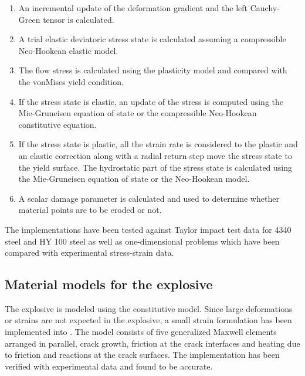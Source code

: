 \begin{itemize}
\begin{enumerate}
        \item An incremental update of the deformation gradient and
              the left Cauchy-Green tensor is calculated.
        \item A trial elastic deviatoric stress state is calculated
              assuming a compressible Neo-Hookean elastic model.
        \item The flow stress is calculated using the plasticity
              model and compared with the vonMises yield condition.
        \item If the stress state is elastic, an update of the 
              stress is computed using the Mie-Gruneisen equation
              of state or the compressible Neo-Hookean constitutive
              equation.
        \item If the stress state is plastic, all the strain rate 
              is considered to the plastic and an elastic correction
              along with a radial return step move the stress state
              to the yield surface.  The hydrostatic part of the 
              stress state is calculated using the Mie-Gruneisen
              equation of state or the Neo-Hookean model.
        \item A scalar damage parameter is calculated and used
              to determine whether material points are to be eroded
              or not.
     \end{enumerate}
\end{itemize}

The implementations have been tested against Taylor impact test data
for 4340 steel and HY 100 steel as well as one-dimensional problems
which have been compared with experimental stress-strain data.  

\subsection{Material models for the explosive}
The explosive is modeled using the  constitutive 
model.  Since large deformations or strains are not expected in 
the explosive, a small strain formulation has been implemented into 
\Vaango.  The model consists of five generalized Maxwell elements
arranged in parallel, crack growth, friction at the crack 
interfaces and heating due to friction and reactions at the 
crack surfaces.  The implementation has been verified with 
experimental data and found to be accurate.


